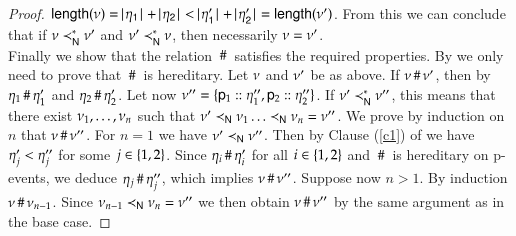 \begin{proof}
 $\length{\netev} = \cardin{\procev_1}+ \cardin{\procev_2} < 
\cardin{\procev'_1} + \cardin{\procev'_2} = \length{\netev'}$. 
From this we can conclude
that if $\nu \prec^* _{{\sf N}} \nu'$ and $\nu' \prec^* _{{\sf N}} \nu$, then
necessarily $ \nu = \nu'$.
\\
Finally we show that the relation $\,\#\,$ satisfies the required
properties. By  we only need to prove that $\,\#\,$ is
hereditary. Let $\nu$ and $\nu'$ be as above. If
$\nu\,\#\,\nu'$, then by 
$\eta_1\,\#\,\eta_1'$ and $\eta_2\,\#\,\eta_2'$.  Let now
$\nu'' =
\{{\sf p}_1:: \eta''_1,{\sf p}_2:: \eta''_2\}$. If
$\nu'\prec^* _{{\sf N}}\nu''$, this means that there exist $\nu_1,
\ldots, \nu_n$ such that $\nu'\prec  _{{\sf N}}\nu_1 \ldots
\prec _{{\sf N}}\nu_n=\nu''$. We prove by induction on $n$ that
$\nu\,\#\,\nu''$. For $n=1$ we have $\nu'\prec _{{\sf N}}\nu''$.  Then
by Clause (\ref{c1}) of  we have $\eta'_j
< \eta''_j$ for some $j\in\{1,2\}$.
 Since $\eta_i \,\#\, \eta'_i$ for all $i\in\{1,2\}$ 
and $\,\#\,$ is hereditary on p-events, we deduce
$\eta_j\,\#\,\eta''_j$, which implies $\nu\,\#\,\nu''$. 
Suppose now $n >1$. By induction $\nu\,\#\,\nu_{n-1}$. Since
$\nu_{n-1} \prec _{{\sf N}}\nu_n=\nu''$ we then obtain
$\nu\,\#\,\nu''$ by the same argument as in the base case.
\end{proof}


